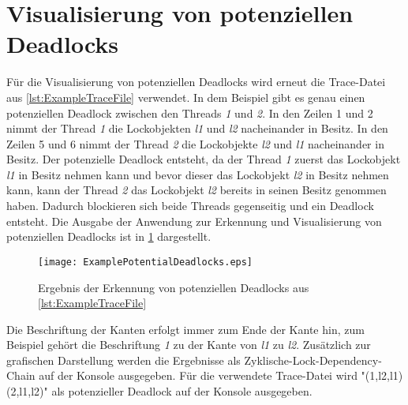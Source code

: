 \section{Visualisierung von potenziellen Deadlocks}
\label{section:DeadlockVisualization}
Für die Visualisierung von potenziellen Deadlocks wird erneut die Trace-Datei
aus \cref{lst:ExampleTraceFile} verwendet. In dem Beispiel gibt es genau einen
potenziellen Deadlock zwischen den Threads \emph{1} und \emph{2}. In den Zeilen
1 und 2 nimmt der Thread \emph{1} die Lockobjekten \emph{l1} und \emph{l2}
nacheinander in Besitz. In den Zeilen 5 und 6 nimmt der Thread \emph{2} die
Lockobjekte \emph{l2} und \emph{l1} nacheinander in Besitz. Der potenzielle
Deadlock entsteht, da der Thread \emph{1} zuerst das Lockobjekt \emph{l1} in
Besitz nehmen kann und bevor dieser das Lockobjekt \emph{l2} in Besitz nehmen
kann, kann der Thread \emph{2} das Lockobjekt \emph{l2} bereits in seinen Besitz
genommen haben. Dadurch blockieren sich beide Threads gegenseitig und ein
Deadlock entsteht. Die Ausgabe der Anwendung zur Erkennung und Visualisierung
von potenziellen Deadlocks ist in \cref{fig:DeadlockVisualization} dargestellt.
\begin{figure}[ht]
  \texttt{[image: ExamplePotentialDeadlocks.eps]}
  \caption{Ergebnis der Erkennung von potenziellen Deadlocks aus \cref{lst:ExampleTraceFile}}
  \label{fig:DeadlockVisualization}
\end{figure}
Die Beschriftung der Kanten erfolgt immer zum Ende der Kante hin, zum Beispiel
gehört die Beschriftung \emph{1} zu der Kante von \emph{l1} zu \emph{l2}.
Zusätzlich zur grafischen Darstellung werden die Ergebnisse als
Zyklische-Lock-Dependency-Chain auf der Konsole ausgegeben. Für die verwendete
Trace-Datei wird "(1,l2,{l1}) (2,l1,{l2})" als potenzieller Deadlock auf der
Konsole ausgegeben.